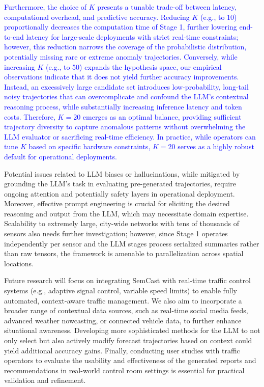 \documentclass{article}
\begin{document}
\textcolor{blue}{Furthermore, the choice of $K$ presents a tunable trade-off between latency, computational overhead, and predictive accuracy. Reducing $K$ (e.g., to 10) proportionally decreases the computation time of Stage 1, further lowering end-to-end latency for large-scale deployments with strict real-time constraints; however, this reduction narrows the coverage of the probabilistic distribution, potentially missing rare or extreme anomaly trajectories. Conversely, while increasing $K$ (e.g., to 50) expands the hypothesis space, our empirical observations indicate that it does not yield further accuracy improvements. Instead, an excessively large candidate set introduces low-probability, long-tail noisy trajectories that can overcomplicate and confound the LLM's contextual reasoning process, while substantially increasing inference latency and token costs. Therefore, $K=20$ emerges as an optimal balance, providing sufficient trajectory diversity to capture anomalous patterns without overwhelming the LLM evaluator or sacrificing real-time efficiency. In practice, while operators can tune $K$ based on specific hardware constraints, $K=20$ serves as a highly robust default for operational deployments.}

Potential issues related to LLM biases or hallucinations, while mitigated by grounding the LLM's task in evaluating pre-generated trajectories, require ongoing attention and potentially safety layers in operational deployment. Moreover, effective prompt engineering is crucial for eliciting the desired reasoning and output from the LLM, which may necessitate domain expertise. Scalability to extremely large, city-wide networks with tens of thousands of sensors also needs further investigation; however, since Stage 1 operates independently per sensor and the LLM stages process serialized summaries rather than raw tensors, the framework is amenable to parallelization across spatial locations.

Future research will focus on integrating SemCast with real-time traffic control systems (e.g., adaptive signal control, variable speed limits) to enable fully automated, context-aware traffic management. We also aim to incorporate a broader range of contextual data sources, such as real-time social media feeds, advanced weather nowcasting, or connected vehicle data, to further enhance situational awareness. Developing more sophisticated methods for the LLM to not only select but also actively modify forecast trajectories based on context could yield additional accuracy gains. Finally, conducting user studies with traffic operators to evaluate the usability and effectiveness of the generated reports and recommendations in real-world control room settings is essential for practical validation and refinement.
\end{document}
